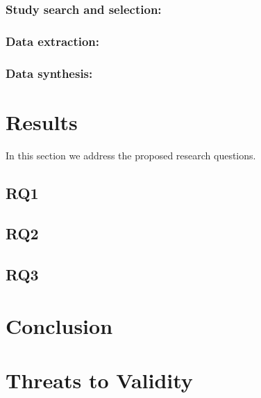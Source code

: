\documentclass[sigconf]{acmart}
\begin{document}
\subsubsection{Study search and selection:}

\subsubsection{Data extraction:}

\subsubsection{Data synthesis:}


\section{Results}

In this section we address the proposed research questions.

\subsection{RQ1}
\subsection{RQ2}
\subsection{RQ3}


\section{Conclusion}

\section{Threats to Validity}
\balance



\end{document}
